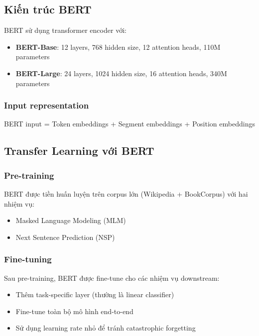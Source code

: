 \subsection{Kiến trúc BERT}

BERT sử dụng transformer encoder với:
\begin{itemize}
    \item \textbf{BERT-Base}: 12 layers, 768 hidden size, 12 attention heads, 110M parameters
    \item \textbf{BERT-Large}: 24 layers, 1024 hidden size, 16 attention heads, 340M parameters
\end{itemize}

\subsubsection{Input representation}

BERT input = Token embeddings + Segment embeddings + Position embeddings

\subsection{Transfer Learning với BERT}

\subsubsection{Pre-training}

BERT được tiền huấn luyện trên corpus lớn (Wikipedia + BookCorpus) với hai nhiệm vụ:
\begin{itemize}
    \item Masked Language Modeling (MLM)
    \item Next Sentence Prediction (NSP)
\end{itemize}

\subsubsection{Fine-tuning}

Sau pre-training, BERT được fine-tune cho các nhiệm vụ downstream:
\begin{itemize}
    \item Thêm task-specific layer (thường là linear classifier)
    \item Fine-tune toàn bộ mô hình end-to-end
    \item Sử dụng learning rate nhỏ để tránh catastrophic forgetting
\end{itemize}

